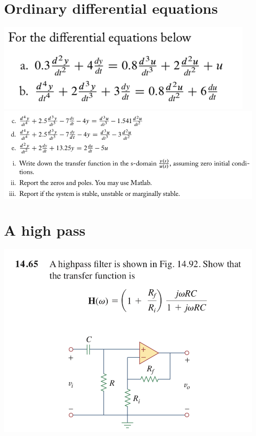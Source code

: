 \documentclass[11pt]{book}
\begin{document}
\section{Ordinary differential equations}
\begin{center}
	\includegraphics{figures/q3.13.png} \\
	\includegraphics{figures/q3.14.png}
\end{center}

\newpage

\section{A high pass}
\begin{center}
	\includegraphics[width=\textwidth]{figures/q3.34.png} 
\end{center}
\end{document}
